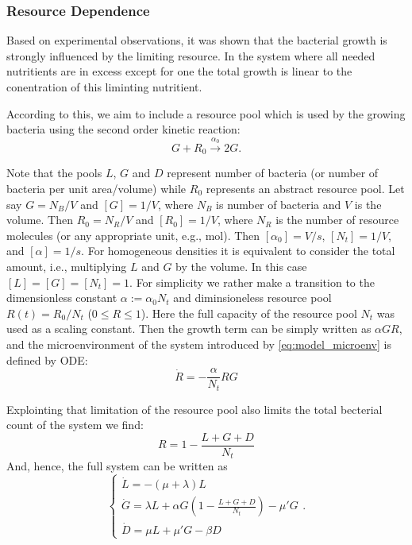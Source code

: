 \documentclass[10pt,A4paper]{article}
\begin{document}
\subsubsection{Resource Dependence}

Based on experimental observations, it was shown that the bacterial growth is strongly influenced by the limiting resource. 
In the system where all needed nutritients are in excess except for one the total growth is linear to the conentration of this liminting nutritient. 
\cite{monodGrowthBacterialCultures1949}

According to this, we aim to include a resource pool which is used by the growing bacteria using the second order kinetic reaction:
\begin{equation}
    G + R_0  \stackrel{\alpha_0}{\longrightarrow} 2G.
\end{equation}

Note that the pools $L$, $G$ and $D$ represent number of bacteria (or number of bacteria per unit area/volume) while $R_0$ represents an abstract resource pool. 
Let say $G=N_B/V$ and $[G]=1/V$, where $N_B$ is number of bacteria and $V$ is the volume. 
Then $R_0=N_R/V$ and $[R_0]=1/V$, where $N_R$ is the number of resource molecules (or any appropriate unit, e.g., mol). 
Then $[\alpha_0]=V/s$, $[N_t]=1/V$, and $[\alpha]=1/s$. 
For homogeneous densities it is equivalent to consider the total amount, i.e., multiplying $L$ and $G$ by the volume. 
In this case $[L]=[G]=[N_t]=1$.
For simplicity we rather make a transition to the dimensionless constant $\alpha:=\alpha_0 N_t$ and diminsioneless resource pool $R(t) = R_0 / N_t$ ($0 \leqslant R \leqslant 1$).
Here the full capacity of the resource pool $N_t$ was used as a scaling constant.
Then the growth term can be simply written as $\alpha G R$, and the microenvironment of the system introduced by \ref{eq:model_microenv} is defined by ODE:
\begin{equation}
\dot{R} = -\frac{\alpha}{N_t} R G
\end{equation}

Explointing that limitation of the resource pool also limits the total becterial count of the system  we find:
\begin{equation}
    R = 1 - \frac{L+G+D}{N_t}
\end{equation}
And, hence, the full system can be written as
\begin{equation}
    \begin{cases}
        \dot{L} = -(\mu + \lambda) L\\
        \dot{G} = \lambda L + \alpha G\left(1-\frac{L+G+D}{N_t}\right)-\mu' G\\
        \dot{D} = \mu  L + \mu' G- \beta D  
    \end{cases}.
\end{equation}
\end{document}

